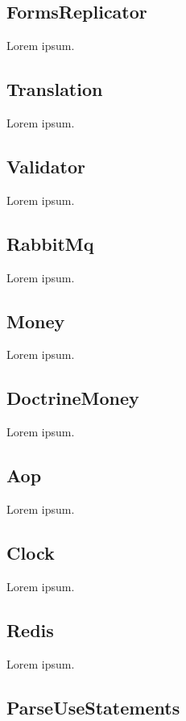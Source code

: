 \subsection{FormsReplicator}

Lorem ipsum.

\subsection{Translation}

Lorem ipsum.

\subsection{Validator}

Lorem ipsum.

\subsection{RabbitMq}

Lorem ipsum.

\subsection{Money}

Lorem ipsum.

\subsection{DoctrineMoney}

Lorem ipsum.

\subsection{Aop}

Lorem ipsum.

\subsection{Clock}

Lorem ipsum.

\subsection{Redis}

Lorem ipsum.

\subsection{ParseUseStatements}

